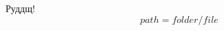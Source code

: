 \documentclass[12pt]{article}
\begin{document}
Руддщ!
\begin{equation}
path=folder/file
\end{equation}
\end{document}
